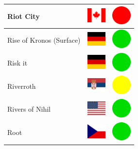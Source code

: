 \documentclass[12pt, a4paper, twoside]{report}
\begin{document}
\begin{center}
\begin{longtable}{|p{5cm}|p{2cm}|p{2cm}|}
Riot City & \includegraphics[width=1cm]{4x3/ca} & \includegraphics[width=1cm]{likes/n} \\ \hline
Rise of Kronos (Surface) & \includegraphics[width=1cm]{4x3/de} & \includegraphics[width=1cm]{likes/y} \\ \hline
Risk it & \includegraphics[width=1cm]{4x3/de} & \includegraphics[width=1cm]{likes/y} \\ \hline
Riverroth & \includegraphics[width=1cm]{4x3/rs} & \includegraphics[width=1cm]{likes/m} \\ \hline
Rivers of Nihil & \includegraphics[width=1cm]{4x3/us} & \includegraphics[width=1cm]{likes/y} \\ \hline
Root & \includegraphics[width=1cm]{4x3/cz} & \includegraphics[width=1cm]{likes/y} \\ \hline

\end{longtable}
\end{center}
\end{document}
